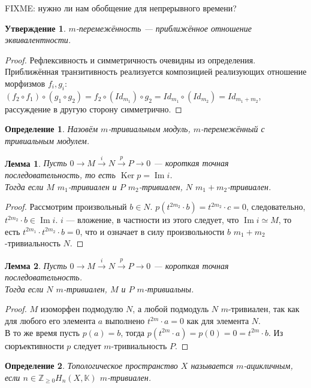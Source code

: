 \documentclass[a4paper,12pt]{report}
\newtheorem{lemma}{Лемма}
\newtheorem{claim}{Утверждение}
\newtheorem{definition}{Определение}
\begin{document}
FIXME: нужно ли нам обобщение для непрерывного времени?
\begin{claim}
  $m$-перемежённость --- приближённое отношение эквивалентности.
\end{claim}
\begin{proof}
  Рефлексивность и симметричность очевидны из определения.\\
  Приближённая транзитивность реализуется композицией реализующих отношение морфизмов $f_i, g_i$:\\
  $(f_2 \circ f_1) \circ (g_1 \circ g_2) = f_2 \circ (Id_{m_1}) \circ g_2 = Id_{m_1} \circ (Id_{m_2}) = Id_{m_1 + m_2}$, рассуждение в другую сторону симметрично.
\end{proof}
\begin{definition}
  Назовём $m$-тривиальным модуль, $m$-перемежённый с тривиальным модулем.
\end{definition}
\begin{lemma}
  Пусть $0 \to M \xrightarrow{i} N \xrightarrow{p} P \to 0$ --- короткая точная последовательность, то есть $\operatorname{Ker}p = \operatorname{Im}i$.\\
  Тогда если $M$ $m_1$-тривиален и $P$ $m_2$-тривиален, $N$ $m_1 + m_2$-тривиален.
\end{lemma}
\begin{proof}
  Рассмотрим произвольный $b \in N$. $p(t^{2m_2} \cdot b) = t^{2m_2} \cdot c = 0$, следовательно, $t^{2m_2} \cdot b \in \operatorname{Im}i$. $i$ --- вложение, в частности из этого следует, что $\operatorname{Im}i \simeq M$, то есть $t^{2m_1} \cdot t^{2m_2} \cdot b = 0$, что и означает в силу произвольности $b$ $m_1+m_2$-тривиальность $N$.
\end{proof}
\begin{lemma}
  Пусть $0 \to M \xrightarrow{i} N \xrightarrow{p} P \to 0$ --- короткая точная последовательность.\\
  Тогда если $N$ $m$-тривиален, $M$ и $P$ $m$-тривиальны.
\end{lemma}
\begin{proof}
  $M$ изоморфен подмодулю $N$, а любой подмодуль $N$ $m$-тривиален, так как для любого его элемента $a$ выполнено $t^{2m} \cdot a = 0$ как для элемента $N$.\\
  В то же время пусть $p(a) = b$, тогда $p(t^{2m} \cdot a) = p(0) = 0 = t^{2m} \cdot b$. Из сюръективности $p$ следует $m$-тривиальность $P$.
\end{proof}
\begin{definition}
  Топологическое пространство $X$ называется $m$-ацикличным, если $n \in \mathbb{Z}_{\geq 0} H_n(X,\mathbb{K})$ $m$-тривиален.
\end{definition}
\end{document}

